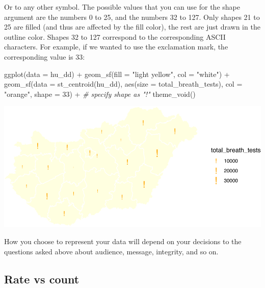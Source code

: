 \documentclass[
]{book}
\newenvironment{Shaded}{\begin{snugshade}}{\end{snugshade}}
\newcommand{\AttributeTok}[1]{\textcolor[rgb]{0.77,0.63,0.00}{#1}}
\newcommand{\CommentTok}[1]{\textcolor[rgb]{0.56,0.35,0.01}{\textit{#1}}}
\newcommand{\DecValTok}[1]{\textcolor[rgb]{0.00,0.00,0.81}{#1}}
\newcommand{\FunctionTok}[1]{\textcolor[rgb]{0.00,0.00,0.00}{#1}}
\newcommand{\NormalTok}[1]{#1}
\newcommand{\SpecialCharTok}[1]{\textcolor[rgb]{0.00,0.00,0.00}{#1}}
\newcommand{\StringTok}[1]{\textcolor[rgb]{0.31,0.60,0.02}{#1}}
\begin{document}
Or to any other symbol. The possible values that you can use for the shape argument are the numbers 0 to 25, and the numbers 32 to 127. Only shapes 21 to 25 are filled (and thus are affected by the fill color), the rest are just drawn in the outline color. Shapes 32 to 127 correspond to the corresponding ASCII characters. For example, if we wanted to use the exclamation mark, the corresponding value is 33:

\begin{Shaded}
\begin{Highlighting}[]
\FunctionTok{ggplot}\NormalTok{(}\AttributeTok{data =}\NormalTok{ hu\_dd) }\SpecialCharTok{+} 
  \FunctionTok{geom\_sf}\NormalTok{(}\AttributeTok{fill =} \StringTok{"light yellow"}\NormalTok{, }
          \AttributeTok{col =} \StringTok{"white"}\NormalTok{) }\SpecialCharTok{+} 
  \FunctionTok{geom\_sf}\NormalTok{(}\AttributeTok{data =} \FunctionTok{st\_centroid}\NormalTok{(hu\_dd), }
          \FunctionTok{aes}\NormalTok{(}\AttributeTok{size =}\NormalTok{ total\_breath\_tests), }
          \AttributeTok{col =} \StringTok{"orange"}\NormalTok{, }
          \AttributeTok{shape =} \DecValTok{33}\NormalTok{) }\SpecialCharTok{+} \CommentTok{\# specify shape as "!"}
  \FunctionTok{theme\_void}\NormalTok{()}
\end{Highlighting}
\end{Shaded}

\includegraphics{crime_mapping_files/figure-latex/gradsymbmapcoldiamond-1.pdf}

How you choose to represent your data will depend on your decisions to the questions asked above about audience, message, integrity, and so on.

\hypertarget{rate-vs-count}{%
\subsection{Rate vs count}\label{rate-vs-count}}
\end{document}
